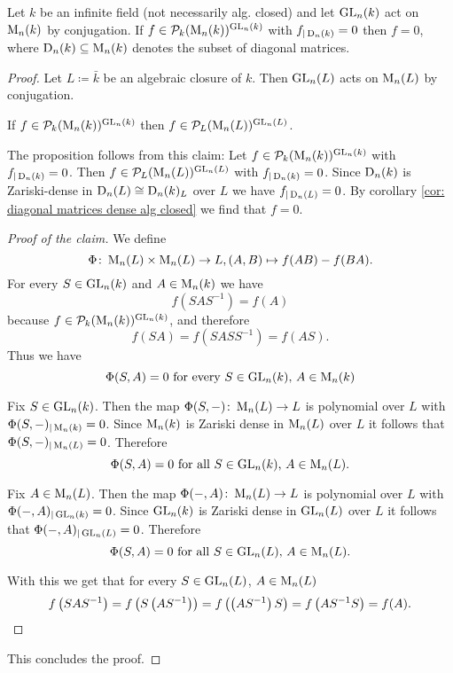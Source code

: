 \begin{prop}
 Let $k$ be an infinite field (not necessarily alg. closed) and let $\operatorname{GL}_n(k)$ act on $\operatorname{M}_n(k)$ by conjugation. If $f \in \mathcal{P}_k(\operatorname{M}_n(k))^{\operatorname{GL}_n(k)}$ with $f_{|\operatorname{D}_n(k)} = 0$ then $f = 0$, where $\operatorname{D}_n(k) \subseteq \operatorname{M}_n(k)$ denotes the subset of diagonal matrices.
\end{prop}
\begin{proof}
 Let $L \coloneqq \bar{k}$ be an algebraic closure of $k$. Then $\operatorname{GL}_n(L)$ acts on $\operatorname{M}_n(L)$ by conjugation.
 
 \begin{claim}
  If $f \in \mathcal{P}_k(\operatorname{M}_n(k))^{\operatorname{GL}_n(k)}$ then $f \in \mathcal{P}_L(\operatorname{M}_n(L))^{\operatorname{GL}_n(L)}$.
 \end{claim}
 
 The proposition follows from this claim: Let $f \in \mathcal{P}_k(\operatorname{M}_n(k))^{\operatorname{GL}_n(k)}$ with $f_{|\operatorname{D}_n(k)} = 0$. Then $f \in \mathcal{P}_L(\operatorname{M}_n(L))^{\operatorname{GL}_n(L)}$ with $f_{|\operatorname{D}_n(k)} = 0$. Since $\operatorname{D}_n(k)$ is Zariski-dense in $\operatorname{D}_n(L) \cong \operatorname{D}_n(k)_L$ over $L$ we have $f_{|\operatorname{D}_n(L)} = 0$. By corollary \ref{cor: diagonal matrices dense alg closed} we find that $f = 0$.
 
 \begin{proof}[Proof of the claim]
  We define
  \[
   \Phi \colon \operatorname{M}_n(L) \times \operatorname{M}_n(L) \to L, (A,B) \mapsto f(AB)-f(BA).
  \]
  For every $S \in \operatorname{GL}_n(k)$ and $A \in \operatorname{M}_n(k)$ we have
  \[
   f\left( SAS^{-1} \right) = f(A)
  \]
  because $f \in \mathcal{P}_k(\operatorname{M}_n(k))^{\operatorname{GL}_n(k)}$, and therefore
  \[
   f(SA) = f\left(SASS^{-1}\right) = f(AS).
  \]
  Thus we have
  \[
   \Phi(S,A) = 0 \text{ for every } S \in \operatorname{GL}_n(k)\text{, }A \in \operatorname{M}_n(k)
  \]
  
  Fix $S \in \operatorname{GL}_n(k)$. Then the map $\Phi(S, -) \colon \operatorname{M}_n(L) \to L$ is polynomial over $L$ with $\Phi(S,-)_{|\operatorname{M}_n(k)} = 0$. Since $\operatorname{M}_n(k)$ is Zariski dense in $\operatorname{M}_n(L)$ over $L$ it follows that $\Phi(S,-)_{|\operatorname{M}_n(L)} = 0$. Therefore
  \[
   \Phi(S,A) = 0 \text{ for all } S \in \operatorname{GL}_n(k)\text{, }A \in \operatorname{M}_n(L).
  \]
  
  Fix $A \in \operatorname{M}_n(L)$. Then the map $\Phi(-,A) \colon \operatorname{M}_n(L) \to L$ is polynomial over $L$ with $\Phi(-,A)_{|\operatorname{GL}_n(k)} = 0$. Since $\operatorname{GL}_n(k)$ is Zariski dense in $\operatorname{GL}_n(L)$ over $L$ it follows that $\Phi(-,A)_{|\operatorname{GL}_n(L)} = 0$. Therefore
  \[
   \Phi(S,A) = 0 \text{ for all } S \in \operatorname{GL}_n(L)\text{, }A \in \operatorname{M}_n(L).
  \]
  
  With this we get that for every $S \in \operatorname{GL}_n(L)$, $A \in \operatorname{M}_n(L)$
  \[
   f\left(SAS^{-1}\right)
   = f\left(S\left(AS^{-1}\right)\right)
   = f\left(\left(AS^{-1}\right)S\right)
   = f\left(AS^{-1}S\right)
   = f(A).
   \qedhere
  \]
 \end{proof}
 
 This concludes the proof.
\end{proof}





